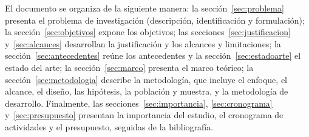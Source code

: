 El documento se organiza de la siguiente manera: la sección~\ref{sec:problema} presenta el problema de investigación (descripción, identificación y formulación); la sección~\ref{sec:objetivos} expone los objetivos; las secciones~\ref{sec:justificacion} y~\ref{sec:alcances} desarrollan la justificación y los alcances y limitaciones; la sección~\ref{sec:antecedentes} reúne los antecedentes y la sección~\ref{sec:estadoarte} el estado del arte; la sección~\ref{sec:marco} presenta el marco teórico; la sección~\ref{sec:metodologia} describe la metodología, que incluye el enfoque, el alcance, el diseño, las hipótesis, la población y muestra, y la metodología de desarrollo. Finalmente, las secciones~\ref{sec:importancia}, \ref{sec:cronograma} y~\ref{sec:presupuesto} presentan la importancia del estudio, el cronograma de actividades y el presupuesto, seguidas de la bibliografía.